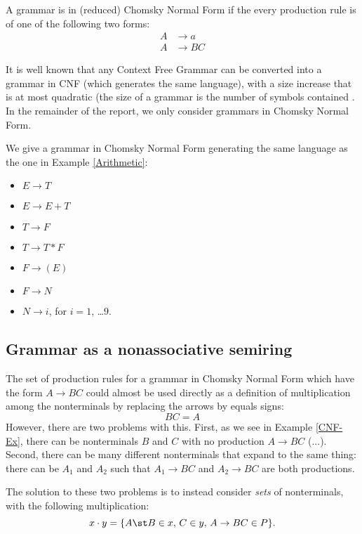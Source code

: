 \begin{Definition}
  A grammar is in (reduced) Chomsky Normal Form \cite{Chomsky} if the every production rule is of one of the following two forms:
  \begin{align*}
  A &\to a\\
  A &\to BC 
  \end{align*}
\end{Definition}
It is well known that any Context Free Grammar can be converted into a grammar in CNF (which generates the same language), with a size increase that is at most quadratic (the size of a grammar is the number of symbols contained \cite{Lange-Leiss}.
In the remainder of the report, we only consider grammars in Chomsky Normal Form.
\begin{Example}
  \label{CNF-Ex}
  We give a grammar in Chomsky Normal Form generating the same language as the one in Example \ref{Arithmetic}:
  \begin{itemize}
  \item \label{pc1} $E \to T$
  \item \label{pc2} $E \to E + T$
  \item \label{pc3} $T \to F$
  \item \label{pc4} $T \to T * F$ 
  \item \label{pc5} $F \to ( E )$
  \item \label{pc6} $F \to N$
  \item \label{pc7} $N \to i$, for $i = 1$, \ldots $9$. 
  \end{itemize}
\end{Example}
\subsection{Grammar as a nonassociative semiring}
\label{Parsing-Algebra}
The set of production rules for a grammar in Chomsky Normal Form which have the form $A \to BC$ could almost be used directly as a definition of multiplication among the nonterminals by replacing the arrows by equals signs:
\begin{equation*}
  BC = A
\end{equation*}
However, there are two problems with this. First, as we see in Example \ref{CNF-Ex}, there can be nonterminals $B$ and $C$ with no production $A \to BC$ (...). Second, there can be many different nonterminals that expand to the same thing: there can be $A_1$ and $A_2$ such that $A_1 \to BC$ and $A_2 \to BC$ are both productions.

The solution to these two problems is to instead consider \emph{sets} of nonterminals, with the following multiplication:
\begin{equation*}
  x \cdot y = \{A \st B \in x,\, C \in y,\, A \to BC \in P\}.
\end{equation*}

